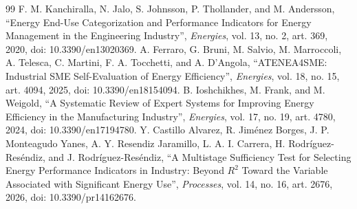 \documentclass[technologies,article,submit,pdftex,moreauthors]{Definitions/mdpi}
\begin{document}
\begin{thebibliography}{99}
 F. M. Kanchiralla, N. Jalo, S. Johnsson, P. Thollander, and M. Andersson, ``Energy End-Use Categorization and Performance Indicators for Energy Management in the Engineering Industry'', \emph{Energies}, vol. 13, no. 2, art. 369, 2020, doi: 10.3390/en13020369.
 A. Ferraro, G. Bruni, M. Salvio, M. Marroccoli, A. Telesca, C. Martini, F. A. Tocchetti, and A. D'Angola, ``ATENEA4SME: Industrial SME Self-Evaluation of Energy Efficiency'', \emph{Energies}, vol. 18, no. 15, art. 4094, 2025, doi: 10.3390/en18154094.
 B. Ioshchikhes, M. Frank, and M. Weigold, ``A Systematic Review of Expert Systems for Improving Energy Efficiency in the Manufacturing Industry'', \emph{Energies}, vol. 17, no. 19, art. 4780, 2024, doi: 10.3390/en17194780.
 Y. Castillo Alvarez, R. Jim\'enez Borges, J. P. Monteagudo Yanes, A. Y. Resendiz Jaramillo, L. A. I. Carrera, H. Rodr\'iguez-Res\'endiz, and J. Rodr\'iguez-Res\'endiz, ``A Multistage Sufficiency Test for Selecting Energy Performance Indicators in Industry: Beyond $R^{2}$ Toward the Variable Associated with Significant Energy Use'', \emph{Processes}, vol. 14, no. 16, art. 2676, 2026, doi: 10.3390/pr14162676.
\end{thebibliography}
\end{document}
